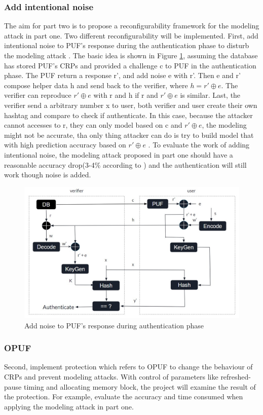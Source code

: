 \subsubsection{Add intentional noise}
The aim for part two is to propose a reconfigurability framework for the modeling attack in part one. Two different reconfigurability will be implemented. First, add intentional
noise to PUF's response during the authentication phase to disturb the modeling attack \cite{Reference8}. The basic idea is shown in Figure \ref{fig:figure10}, assuming the database has stored PUF's CRPs and provided a challenge c
to PUF in the authentication phase. The PUF return a response r', and add noise e with r'. Then e and r' compose helper data h and send back to the verifier, where $h = r'\oplus e$. The verifier can reproduce $r'\oplus e$  
with r and h if r and $r'\oplus e$ is similar. Last, the verifier send a arbitrary number x to user, both verifier and user create their own hashtag and compare to check if authenticate. In this case, because the attacker cannot accesses to r, they can only model based on c and $r'\oplus e$, the modeling
might not be accurate, tha only thing attacker can do is try to build model that with high prediction accuracy based on $r'\oplus e$ \cite{Reference8}. To evaluate the work of adding intentional noise, the modeling attack proposed in part one should have a reasonable accuracy drop(3-4\% according to \cite{Reference8}) and the authentication will still work 
though noise is added.

\begin{figure}[htp]
    \centering
    \includegraphics[width=15cm]{figures/figure10.jpg}
    \caption{Add noise to PUF's response during authentication phase \cite{Reference8}}
    \label{fig:figure10}
    \end{figure}

\subsubsection{OPUF}
Second, implement protection which refers to OPUF to change the behaviour of CRPs and prevent modeling attacks. With control of parameters like refreshed-pause timing and allocating memory block, 
the project will examine the result of the protection. For example, evaluate the accuracy and time consumed when applying the modeling attack in part one.






